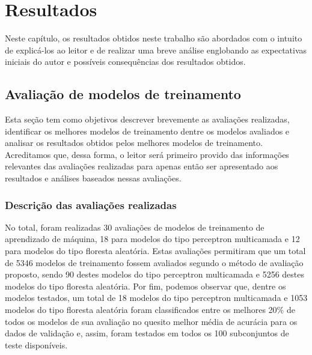 \chapter{Resultados} \label{chap:resultados}

Neste capítulo, os resultados obtidos neste trabalho são abordados com o intuito de explicá-los ao leitor e de realizar uma breve análise englobando as expectativas iniciais do autor e possíveis consequências dos resultados obtidos.

\section{Avaliação de modelos de treinamento}

Esta seção tem como objetivos descrever brevemente as avaliações realizadas, identificar os melhores modelos de treinamento dentre os modelos avaliados e analisar os resultados obtidos pelos melhores modelos de treinamento. Acreditamos que, dessa forma, o leitor será primeiro provido das informações relevantes das avaliações realizadas para apenas então ser apresentado aos resultados e análises baseados nessas avaliações.

\subsection{Descrição das avaliações realizadas}

No total, foram realizadas 30 avaliações de modelos de treinamento de aprendizado de máquina, 18 para modelos do tipo perceptron multicamada e 12 para modelos do tipo floresta aleatória. Estas avaliações permitiram que um total de 5346 modelos de treinamento fossem avaliados segundo o método de avaliação proposto, sendo 90 destes modelos do tipo perceptron multicamada e 5256 destes modelos do tipo floresta aleatória. Por fim, podemos observar que, dentre os modelos testados, um total de 18 modelos do tipo perceptron multicamada e 1053 modelos do tipo floresta aleatória foram classificados entre os melhores 20\% de todos os modelos de sua avaliação no quesito melhor média de acurácia para os dados de validação e, assim, foram testados em todos os 100 subconjuntos de teste disponíveis.

